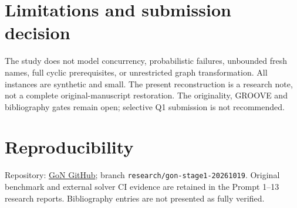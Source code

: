 \documentclass[10pt,a4paper]{article}
\begin{document}
\section{Limitations and submission decision}
The study does not model concurrency, probabilistic failures, unbounded fresh names, full cyclic prerequisites, or unrestricted graph transformation. All instances are synthetic and small. The present reconstruction is a research note, not a complete original-manuscript restoration. The originality, GROOVE and bibliography gates remain open; selective Q1 submission is not recommended.
\section*{Reproducibility}
Repository: \href{https://github.com/Arithmetic-Power-Geometry/The-Geometry-of-Natality}{GoN GitHub}; branch \texttt{research/gon-stage1-20261019}. Original benchmark and external solver CI evidence are retained in the Prompt 1--13 research reports. Bibliography entries are not presented as fully verified.
\end{document}
